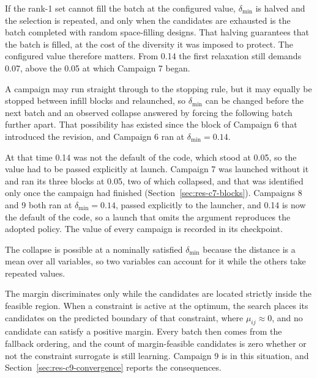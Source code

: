 \begin{itemize}
        If the rank-1 set cannot fill the batch at the configured
        value, $\delta_\mathrm{min}$ is halved and the selection is
        repeated, and only when the candidates are exhausted is the
        batch completed with random space-filling designs. That
        halving guarantees that the batch is filled, at the cost of
        the diversity it was imposed to protect. The configured value
        therefore matters. From 0.14 the first relaxation still demands
        0.07, above the 0.05 at which Campaign 7 began.

        A campaign may run straight through to the stopping rule, but
        it may equally be stopped between infill blocks and relaunched,
        so $\delta_\mathrm{min}$ can be changed before the next batch
        and an observed collapse answered by forcing the following
        batch further apart. That possibility has existed since the
        block of Campaign 6 that introduced the revision, and
        Campaign 6 ran at $\delta_\mathrm{min} = 0.14$.

        At that time 0.14 was not the default of the code, which
        stood at 0.05, so the value had to be passed explicitly at
        launch. Campaign 7 was launched without it and ran its three
        blocks at 0.05, two of which collapsed, and that was identified
        only once the campaign had finished
        (Section~\ref{sec:res-c7-blocks}). Campaigns 8 and 9 both ran
        at $\delta_\mathrm{min} = 0.14$, passed explicitly to the
        launcher, and 0.14 is now the default of the code, so a launch
        that omits the argument reproduces the adopted policy. The
        value of every campaign is recorded in its checkpoint.

        The collapse is possible at a nominally satisfied
        $\delta_\mathrm{min}$ because the distance is a mean over all
        variables, so two variables can account for it while the others
        take repeated values.
\end{itemize}

The margin discriminates only while the candidates are located strictly
inside the feasible region. When a constraint is active at the optimum,
the search places its candidates on the predicted boundary of that
constraint, where $\mu_{ij} \approx 0$, and no candidate can satisfy a
positive margin. Every batch then comes from the fallback ordering, and
the count of margin-feasible candidates is zero whether or not the
constraint surrogate is still learning. Campaign 9 is in this
situation, and Section~\ref{sec:res-c9-convergence} reports the
consequences.

